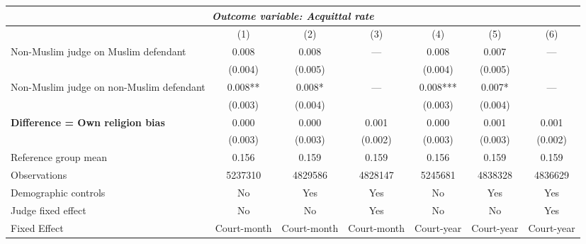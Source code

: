 {
\def\sym#1{\ifmmode^{#1}\else\(^{#1}\)\fi}
\begin{tabular}{l*{6}{c}}
  \hline\hline
\multicolumn{7}{c}{\textit{Outcome variable: Acquittal rate}}\\
\hline
&\multicolumn{1}{c}{(1)}&\multicolumn{1}{c}{(2)}&\multicolumn{1}{c}{(3)}&\multicolumn{1}{c}{(4)}&\multicolumn{1}{c}{(5)}&\multicolumn{1}{c}{(6)}\\
\hline
Non-Muslim judge on Muslim defendant \hspace{15mm}& 0.008 & 0.008 & --- & 0.008 & 0.007 & --- \\
& (0.004) & (0.005) &  & (0.004) &(0.005) &  \\
Non-Muslim judge on non-Muslim defendant \hspace{15mm}& 0.008** & 0.008* & ---& 0.008*** & 0.007* & --- \\
& (0.003) & (0.004) &  & (0.003) & (0.004) &  \\
\textbf{Difference = Own religion bias} & 0.000 & 0.000 & 0.001 & 0.000 & 0.001 & 0.001 \\
& (0.003) & (0.003) & (0.002) & (0.003) & (0.003) & (0.002) \\
\hline
Reference group mean & 0.156 & 0.159 & 0.159 & 0.156 & 0.159 & 0.159 \\
Observations & 5237310 & 4829586 & 4828147 & 5245681 & 4838328 & 4836629 \\
Demographic controls & No & Yes & Yes & No & Yes & Yes \\
Judge fixed effect & No & No & Yes & No & No & Yes \\
Fixed Effect & Court-month & Court-month & Court-month & Court-year & Court-year & Court-year \\
\hline\hline
\end{tabular}
}
 
